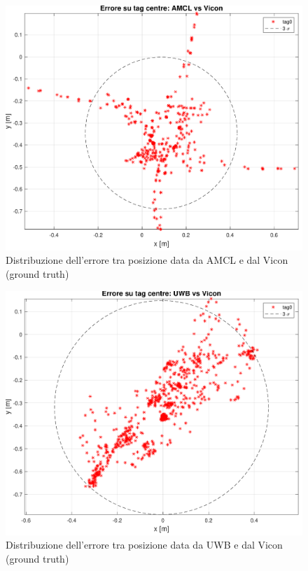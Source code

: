 \begin{figure}[] 
	\centering    
	\includegraphics[height=.3\textheight]{grafici_stanzavolo_vicon/figure19.pdf}
	\caption{Distribuzione dell'errore tra posizione data da AMCL e dal Vicon (ground truth)}
	\label{fig: err_amclvic_sphere_vicon_charlie}
\end{figure}

\begin{figure}[] 
	\centering    
	\includegraphics[height=.3\textheight]{grafici_stanzavolo_vicon/figure13.pdf}
	\caption{Distribuzione dell'errore tra posizione data da UWB e dal Vicon (ground truth)}
	\label{fig: err_uwbvic_sphere_vicon_charlie}
\end{figure}


